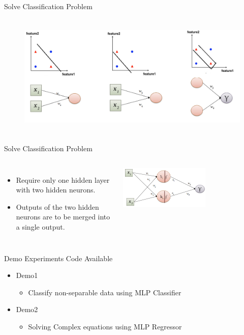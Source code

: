 \documentclass[aspectratio=169,13pt,usenames,dvipsnames]{beamer}
\begin{document}
\begin{frame}{ Solve Classification Problem }
\begin{figure}
\includegraphics[width=12cm, height=6cm]{Images/AIML_MLP_IMG12.jpg}
\end{figure}
\end{frame}

\begin{frame}{ Solve Classification Problem }
\begin{columns}
\begin{itemize}
  \item Require only one hidden layer with two hidden neurons.
  \item Outputs of the two hidden neurons are to be merged into a single output.
\end{itemize}
\includegraphics[width=0.6\textwidth, height=0.3\textheight]{Images/AIML_MLP_IMG13.jpg}
\end{columns}
\end{frame}

\begin{frame}{Demo Experiments}
\alert{Code Available}
\begin{itemize}
\item {Demo1}
	\begin{itemize}
		\item Classify non-separable data using MLP Classifier
	\end{itemize}
\item {Demo2}
	\begin{itemize}
		\item Solving Complex equations using MLP Regressor
	\end{itemize}
\end{itemize}
\end{frame}
\end{document}
